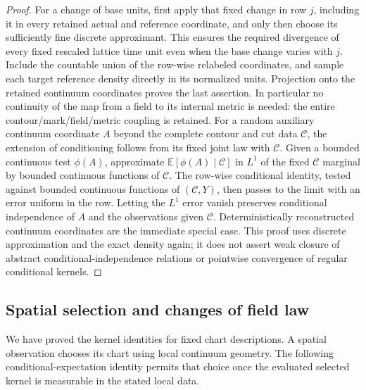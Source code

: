 \begin{proof}
For a change of base units, first apply that fixed change in row $j$,
including it in every retained actual and reference coordinate, and only then
choose its sufficiently fine discrete approximant.  This ensures the
required divergence of every fixed rescaled lattice time unit even
when the base change varies with $j$.  Include the countable union of
the row-wise relabeled coordinates, and sample each target reference
density directly in its normalized units.  Projection onto the retained
continuum coordinates proves the last assertion.  In particular no
continuity of the map from a field to its internal metric is needed:
the entire contour/mark/field/metric coupling is retained.
For a random auxiliary continuum coordinate $A$ beyond the complete
contour and cut data $\mathcal C$, the extension of conditioning follows
from its fixed joint law with $\mathcal C$.  Given a bounded continuous
test $\phi(A)$, approximate $\mathbb E[\phi(A)\mid\mathcal C]$ in
$L^1$ of the fixed $\mathcal C$ marginal by bounded continuous functions
of $\mathcal C$.  The row-wise conditional identity, tested against
bounded continuous functions of $(\mathcal C,Y)$, then passes to
the limit with an error uniform in the row.  Letting the $L^1$ error
vanish preserves conditional independence of $A$ and the observations
given $\mathcal C$.  Deterministically reconstructed continuum coordinates are
the immediate special case.
This proof uses discrete approximation and the exact density again;
it does not assert weak closure of abstract conditional-independence
relations or pointwise convergence of regular conditional kernels.
\end{proof}

\subsection{Spatial selection and changes of field law}

We have proved the kernel identities for fixed chart descriptions. A
spatial observation chooses its chart using local continuum geometry.
The following conditional-expectation identity permits that choice once
the evaluated selected kernel is measurable in the stated local data.

